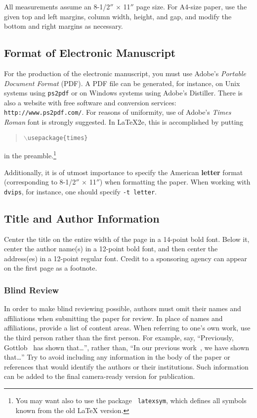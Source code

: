 \documentclass{article}
\theoremstyle{definition}
\begin{document}
All measurements assume an 8-1/2$''$ $\times$ 11$''$ page size. For
A4-size paper, use the given top and left margins, column width,
height, and gap, and modify the bottom and right margins as necessary.

\subsection{Format of Electronic Manuscript}

For the production of the electronic manuscript, you must use Adobe's
{\em Portable Document Format} (PDF). A PDF file can be generated, for
instance, on Unix systems using {\tt ps2pdf} or on Windows systems
using Adobe's Distiller. There is also a website with free software
and conversion services: {\tt http://www.ps2pdf.com/}. For reasons of
uniformity, use of Adobe's {\em Times Roman} font is strongly suggested. In
\LaTeX2e{}, this is accomplished by putting
\begin{quote} 
\mbox{\tt $\backslash$usepackage\{times\}}
\end{quote}
in the preamble.\footnote{You may want also to use the package {\tt
latexsym}, which defines all symbols known from the old \LaTeX{}
version.}
  
Additionally, it is of utmost importance to specify the American {\bf
letter} format (corresponding to 8-1/2$''$ $\times$ 11$''$) when
formatting the paper. When working with {\tt dvips}, for instance, one
should specify {\tt -t letter}.

\subsection{Title and Author Information}

Center the title on the entire width of the page in a 14-point bold
font. Below it, center the author name(s) in a 12-point bold font, and
then center the address(es) in a 12-point regular font. Credit to a
sponsoring agency can appear on the first page as a footnote.

\subsubsection{Blind Review}

In order to make blind reviewing possible, authors must omit their
names and affiliations when submitting the paper for review. In place
of names and affiliations, provide a list of content areas. When
referring to one's own work, use the third person rather than the
first person. For example, say, ``Previously,
Gottlob~ has shown that\ldots'', rather
than, ``In our previous work~\cite{gottlob:nonmon}, we have shown
that\ldots'' Try to avoid including any information in the body of the
paper or references that would identify the authors or their
institutions. Such information can be added to the final camera-ready
version for publication.
\end{document}
